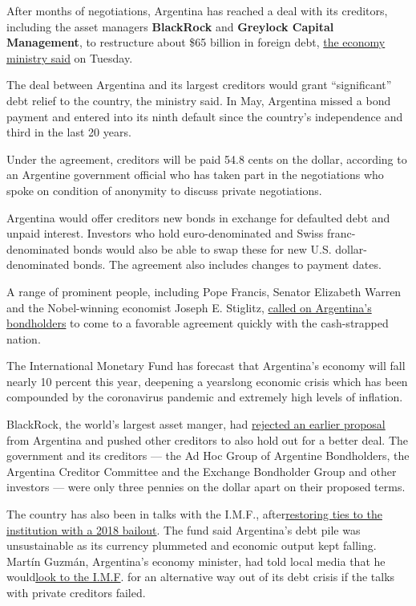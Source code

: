 After months of negotiations, Argentina has reached a deal with its
creditors, including the asset managers \textbf{BlackRock} and
\textbf{Greylock Capital Management}, to restructure about \$65 billion
in foreign debt,
\href{https://www.economia.gob.ar/en/argentina-and-three-creditor-groups-reach-a-deal-on-debt-restructuring/}{the
economy ministry said} on Tuesday.

The deal between Argentina and its largest creditors would grant
``significant'' debt relief to the country, the ministry said. In May,
Argentina missed a bond payment and entered into its ninth default since
the country's independence and third in the last 20 years.

Under the agreement, creditors will be paid 54.8 cents on the dollar,
according to an Argentine government official who has taken part in the
negotiations who spoke on condition of anonymity to discuss private
negotiations.

Argentina would offer creditors new bonds in exchange for defaulted debt
and unpaid interest. Investors who hold euro-denominated and Swiss
franc-denominated bonds would also be able to swap these for new U.S.
dollar-denominated bonds. The agreement also includes changes to payment
dates.

A range of prominent people, including Pope Francis, Senator Elizabeth
Warren and the Nobel-winning economist Joseph E. Stiglitz,
\href{https://www.nytimes3xbfgragh.onion/2020/05/22/world/americas/argentina-default.html}{called
on Argentina's bondholders} to come to a favorable agreement quickly
with the cash-strapped nation.

The International Monetary Fund has forecast that Argentina's economy
will fall nearly 10 percent this year, deepening a yearslong economic
crisis which has been compounded by the coronavirus pandemic and
extremely high levels of inflation.

BlackRock, the world's largest asset manger, had
\href{https://www.nytimes3xbfgragh.onion/2020/07/31/business/argentina-debt.html}{rejected
an earlier proposal} from Argentina and pushed other creditors to also
hold out for a better deal. The government and its creditors --- the Ad
Hoc Group of Argentine Bondholders, the Argentina Creditor Committee and
the Exchange Bondholder Group and other investors --- were only three
pennies on the dollar apart on their proposed terms.

The country has also been in talks with the I.M.F.,
after\href{https://qz.com/1274875/how-argentina-went-from-selling-100-year-bonds-to-an-imf-rescue-in-a-matter-of-months/}{restoring
ties to the institution with a 2018 bailout}. The fund said Argentina's
debt pile was unsustainable as its currency plummeted and economic
output kept falling. Martín Guzmán, Argentina's economy minister, had
told local media that he
would\href{https://www.pagina12.com.ar/282488-deuda-la-ultima-oferta-y-el-mensaje-de-martin-guzman}{look
to the I.M.F}. for an alternative way out of its debt crisis if the
talks with private creditors failed.

